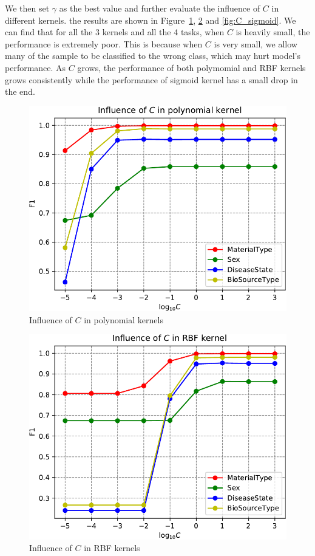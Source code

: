 \documentclass[sigconf]{acmart}
\begin{document}
We then set $\gamma$ as the best value and further evaluate the influence of $C$ in different kernels. the results are shown in Figure~\ref{fig:C_poly}, \ref{fig:C_rbf} and \ref{fig:C_sigmoid}. We can find that for all the 3 kernels and all the 4 tasks, when $C$ is heavily small, the performance is extremely poor. This is because when $C$ is very small, we allow many of the sample to be classified to the wrong class, which may hurt model's performance. As $C$ grows, the performance of both polymomial and RBF kernels grows consistently while the performance of sigmoid kernel has a small drop in the end. 


\begin{figure}[h]
\centering
\includegraphics[width=0.8\linewidth]{../figs/C_poly}
\caption{Influence of $C$ in polynomial kernels}
\label{fig:C_poly}
\end{figure}

\begin{figure}[h]
\centering
\includegraphics[width=0.8\linewidth]{../figs/C_rbf}
\caption{Influence of $C$ in RBF kernels}
\label{fig:C_rbf}
\end{figure}
\end{document}
